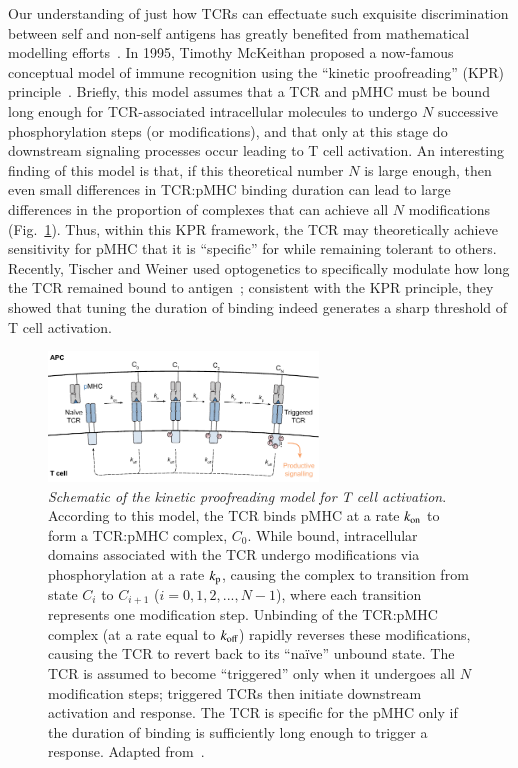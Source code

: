 Our understanding of just how TCRs can effectuate such exquisite discrimination between self and non-self antigens has greatly benefited from mathematical modelling efforts~\cite{feinerman2008quantitative,franccois2016case}. In 1995, Timothy McKeithan proposed a now-famous conceptual model of immune recognition using the ``kinetic proofreading'' (KPR) principle~\cite{mckeithan1995kinetic}. Briefly, this model assumes that a TCR and pMHC must be bound long enough for TCR-associated intracellular molecules to undergo $N$ successive phosphorylation steps (or modifications), and that only at this stage do downstream signaling processes occur leading to T cell activation. An interesting finding of this model is that, if this theoretical number $N$ is large enough, then even small differences in TCR:pMHC binding duration can lead to large differences in the proportion of complexes that can achieve all $N$ modifications (Fig.~\ref{fig:intro_KPR}). Thus, within this KPR framework, the TCR may theoretically achieve sensitivity for pMHC that it is ``specific'' for while remaining tolerant to others. Recently, Tischer and Weiner used optogenetics to specifically modulate how long the TCR remained bound to antigen~\cite{tischer2019light}; consistent with the KPR principle, they showed that tuning the duration of binding indeed generates a sharp threshold of T cell activation.

\begin{figure}[ht]
    \centering
    \includegraphics[width=0.64\textwidth]{Figures/intro/fig3_KPR.pdf}
    \caption[Schematic of the kinetic proofreading model for T cell activation]{%
    \textit{Schematic of the kinetic proofreading model for T cell activation}. %
    According to this model, the TCR binds pMHC at a rate $k_{\textup{on}}$ to form a TCR:pMHC complex, $C_0$. While bound, intracellular domains associated with the TCR undergo modifications via phosphorylation at a rate $k_{\textup{p}}$, causing the complex to transition from state $C_i$ to $C_{i+1}$ ($i=0,1,2,..., N-1$), where each transition represents one modification step. Unbinding of the TCR:pMHC complex (at a rate equal to $k_{\textup{off}}$) rapidly reverses these modifications, causing the TCR to revert back to its ``na\"{i}ve'' unbound state. The TCR is assumed to become ``triggered'' only when it undergoes all $N$ modification steps; triggered TCRs then initiate downstream activation and response. The TCR is specific for the pMHC only if the duration of binding is sufficiently long enough to trigger a response. Adapted from~\cite{mckeithan1995kinetic}.}
    \label{fig:intro_KPR}
\end{figure}

